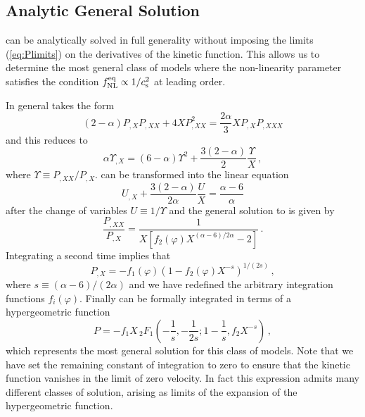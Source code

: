 \subsection{Analytic General Solution}
\label{sec:apx-multi}
 can be analytically solved in full 
generality without imposing the limits (\ref{eq:Plimits}) on the 
derivatives of the kinetic function. This allows us to determine the 
most general class of models where the non-linearity parameter 
satisfies the condition $f_{\mathrm{NL}}^{\mathrm{eq}} \propto 1/c_\mathrm{s}^2$ at leading order. 

In general  takes the form 
% 
\begin{equation}
\label{eq:genPXeqn-multi}
(2-\alpha ) P_{,X}P_{,XX} + 4XP^2_{,XX} = \frac{2\alpha }{3}
X P_{,X}P_{,XXX}
\end{equation}
% 
and this reduces to 
% 
\begin{equation}
\label{eq:genreduce-multi}
\alpha \Upsilon_{,X} = (6-\alpha ) \Upsilon^2 + \frac{3(2-\alpha )}{2}
\frac{\Upsilon}{X} \, ,
\end{equation}
% 
where $\Upsilon \equiv P_{,XX}/P_{,X}$. 
 can be transformed into the 
linear equation
% 
\begin{equation}
\label{eq:lineargen-multi}
U_{,X}+ \frac{3(2-\alpha )}{2\alpha} \frac{U}{X} = \frac{\alpha -6}{\alpha}
\end{equation}
% 
after the change of variables $U \equiv 1/\Upsilon$
and the general solution to  is given by
%  
\begin{equation}
\label{eq:gensolnlinear-multi}
\frac{P_{,XX}}{P_{,X}} = \frac{1}{X\left[ f_2(\varphi) X^{(\alpha -6)/2\alpha}
-2 \right] } \, .
\end{equation}
% 
Integrating a second time implies that
% 
\begin{equation}
\label{eq:secondint-multi}
P_{,X} = -f_1 (\varphi ) \left( 1- f_2(\varphi ) X^{-s} \right)^{1/(2s)}  \, ,
\end{equation}
% 
where $s \equiv (\alpha -6 )/(2 \alpha)$ and we have redefined 
the arbitrary integration functions $f_i(\varphi )$.  
Finally  can be formally integrated 
in terms of a hypergeometric function
%  
\begin{equation}
 \label{eq:thirdint-multi}
 P= -f_1X \,{_2}F_1 \left( -\frac{1}{s}, -\frac{1}{2s}; 1-\frac{1}{s}, f_2X^{-s}
\right)  \, ,
\end{equation}
%  
which represents the most general solution for this class of models. 
Note that we have set the
remaining constant of integration to zero to ensure 
that the kinetic function vanishes in the limit of
zero velocity. In fact this expression admits many 
different classes of solution, arising as limits
of the expansion of the hypergeometric function.


